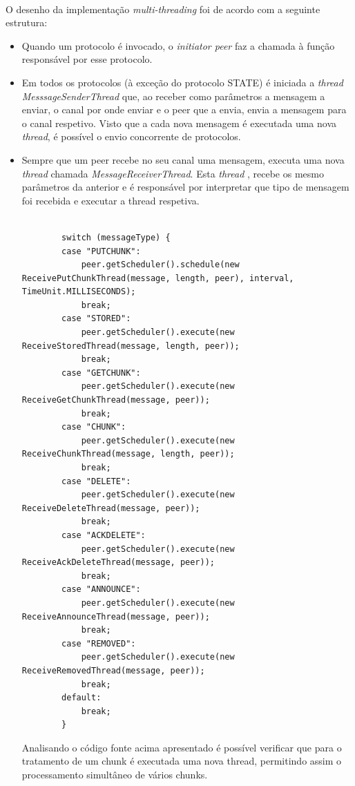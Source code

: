 \documentclass[11pt,oneside]{book}
\begin{document}
\paragraph{}
    O desenho da implementação \textit{multi-threading} foi de acordo com a 
    seguinte estrutura:
    \begin{itemize}
        
        \item Quando um protocolo é invocado, o \textit{initiator peer} faz a
        chamada à função responsável por esse protocolo. 
        \item Em todos os protocolos (à exceção do protocolo STATE) é iniciada a 
        \textit{thread MesssageSenderThread} que, ao receber como parâmetros a
        mensagem a enviar, o canal por onde enviar e o peer que a envia, envia a
        mensagem para o canal respetivo. Visto que a cada nova mensagem é executada
        uma nova \textit{thread}, é possível o envio concorrente de protocolos.
        
        \item Sempre que um peer recebe no seu canal uma mensagem, executa uma nova
        \textit{thread} chamada \textit{MessageReceiverThread}. Esta \textit{thread}
        , recebe os mesmo parâmetros da anterior e é responsável por interpretar 
        que tipo de mensagem foi recebida e executar a thread respetiva. 
        \begin{lstlisting}

		switch (messageType) {
		case "PUTCHUNK":
			peer.getScheduler().schedule(new ReceivePutChunkThread(message, length, peer), interval, TimeUnit.MILLISECONDS);
			break;
		case "STORED":
			peer.getScheduler().execute(new ReceiveStoredThread(message, length, peer));
			break;
		case "GETCHUNK":
			peer.getScheduler().execute(new ReceiveGetChunkThread(message, peer));
			break;
		case "CHUNK":
			peer.getScheduler().execute(new ReceiveChunkThread(message, length, peer));
			break;
		case "DELETE":
			peer.getScheduler().execute(new ReceiveDeleteThread(message, peer));
			break;
		case "ACKDELETE":
			peer.getScheduler().execute(new ReceiveAckDeleteThread(message, peer));
			break;
		case "ANNOUNCE":
			peer.getScheduler().execute(new ReceiveAnnounceThread(message, peer));
			break;
		case "REMOVED":
			peer.getScheduler().execute(new ReceiveRemovedThread(message, peer));
			break;
		default:
			break;
		}
        \end{lstlisting}
        
        Analisando o código fonte acima apresentado é possível verificar que para 
        o tratamento de um chunk é executada uma nova thread, permitindo assim o
        processamento simultâneo de vários chunks.  
        
        
    \end{itemize}
\end{document}
